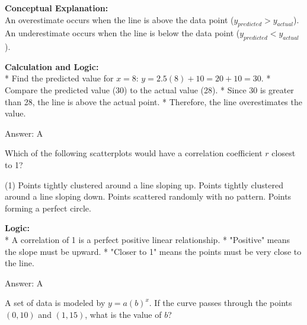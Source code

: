 \documentclass[11pt,paper=a4,answers]{exam}
\begin{document}
\begin{questions}
\begin{solution}
\textbf{Conceptual Explanation:} \\
An overestimate occurs when the line is above the data point ($y_{predicted} > y_{actual}$). An underestimate occurs when the line is below the data point ($y_{predicted} < y_{actual}$).

\vspace{30pt}

\textbf{Calculation and Logic:} \\
* Find the predicted value for $x = 8$: $y = 2.5(8) + 10 = 20 + 10 = 30$.
* Compare the predicted value (30) to the actual value (28).
* Since 30 is greater than 28, the line is above the actual point.
* Therefore, the line overestimates the value.

\vspace{30pt}

Answer: \colorbox{yellow!100}{A}
\end{solution}

\vspace{60pt}

\question
Which of the following scatterplots would have a correlation coefficient $r$ closest to 1?
\begin{tasks}(1)
    \task Points tightly clustered around a line sloping up.
    \task Points tightly clustered around a line sloping down.
    \task Points scattered randomly with no pattern.
    \task Points forming a perfect circle.
\end{tasks}

\begin{solution}
\textbf{Logic:} \\
* A correlation of 1 is a perfect positive linear relationship.
* "Positive" means the slope must be upward.
* "Closer to 1" means the points must be very close to the line.

\vspace{30pt}

Answer: \colorbox{yellow!100}{A}
\end{solution}

\vspace{60pt}

\question
A set of data is modeled by $y = a(b)^x$. If the curve passes through the points $(0, 10)$ and $(1, 15)$, what is the value of $b$?


\end{questions}
\end{document}
